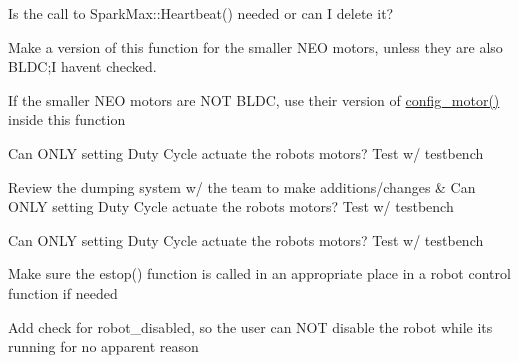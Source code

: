 
\begin{DoxyRefList}
\item[Member \mbox{\hyperlink{classTeleop__Control_a721e6f1d7860c134e2425e8b4bf30193}{Teleop\+\_\+\+Control\+::callback\+\_\+cmd\+\_\+vel}} (const geometry\+\_\+msgs\+::msg\+::\+Twist\+::\+Shared\+Ptr velocity\+\_\+msg)]\label{todo__todo000003}%
%
Is the call to Spark\+Max\+::\+Heartbeat() needed or can I delete it?  
\item[Member \mbox{\hyperlink{classTeleop__Control_a01d088abe449ed0cc43bae2e2f03d185}{Teleop\+\_\+\+Control\+::config\+\_\+motor}} (Spark\+Max \&motor)]\label{todo__todo000001}%
%
Make a version of this function for the smaller NEO motors, unless they are also BLDC;I havent checked. 
\item[Member \mbox{\hyperlink{classTeleop__Control_a7893cf6649ccd2e9c900fd9d8bb8f92c}{Teleop\+\_\+\+Control\+::configure\+\_\+all\+\_\+motors}} ()]\label{todo__todo000002}%
%
If the smaller NEO motors are NOT BLDC, use their version of \mbox{\hyperlink{classTeleop__Control_a01d088abe449ed0cc43bae2e2f03d185}{config\+\_\+motor()}} inside this function 
\item[Member \mbox{\hyperlink{classTeleop__Control_a0088b1dc38c2da500098659975638980}{Teleop\+\_\+\+Control\+::control\+\_\+drive}} ()]\label{todo__todo000005}%
%
Can ONLY setting Duty Cycle actuate the robot\textquotesingle{}s motors? Test w/ testbench  
\item[Member \mbox{\hyperlink{classTeleop__Control_ad327d0210dd5fbbab04b07a2c952f00c}{Teleop\+\_\+\+Control\+::control\+\_\+dumping}} ()]\label{todo__todo000007}%
%
Review the dumping system w/ the team to make additions/changes \& Can ONLY setting Duty Cycle actuate the robot\textquotesingle{}s motors? Test w/ testbench  
\item[Member \mbox{\hyperlink{classTeleop__Control_a6f24f17316a4a9b6f1a77d21e49a5326}{Teleop\+\_\+\+Control\+::control\+\_\+mining}} ()]\label{todo__todo000006}%
%
Can ONLY setting Duty Cycle actuate the robot\textquotesingle{}s motors? Test w/ testbench  
\item[Member \mbox{\hyperlink{classTeleop__Control_a9c391a2fd9a145eb03449274e734cdf6}{Teleop\+\_\+\+Control\+::control\+\_\+robot}} ()]\label{todo__todo000004}%
%
Make sure the estop() function is called in an appropriate place in a robot control function if needed  
\item[Member \mbox{\hyperlink{classTeleop__State__Manager_a97159b47ac56db5f7c81269448a15981}{Teleop\+\_\+\+State\+\_\+\+Manager\+::validate\+\_\+parameters}} (const Param\+Vector \&parameters)]\label{todo__todo000008}%
%
Add check for robot\+\_\+disabled, so the user can NOT disable the robot while its running for no apparent reason 
\end{DoxyRefList}